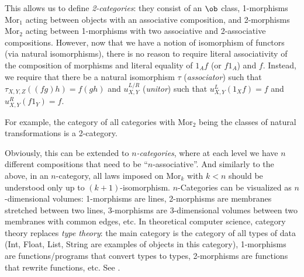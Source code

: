 \begin{rem}
    This allows us to define \emph{2-categories}: they consist of an
    $\ob$ class, 1-morphisms $\mathrm{Mor}_{1}$ acting between objects
    with an associative composition, and 2-morphisms $\mathrm{Mor}_{2}$
    acting between 1-morphisms with two associative and 2-associative
    compositions. However, now that we have a notion of isomorphism of
    functors (via natural isomorphisms), there is no reason to require
    literal associativity of the composition of morphisms and literal
    equality of $1_{A}f$ (or $f1_{A}$) and $f$. Instead, we require
    that there be a natural isomorphism $\tau$ (\emph{associator})
    such that $\tau_{X,Y,Z}\left(\left(fg\right)h\right)=f\left(gh\right)$
    and $u_{X,Y}^{L/R}$ (\emph{unitor}) such that $u_{X,Y}^{L}\left(1_{X}f\right)=f$
    and $u_{X,Y}^{R}\left(f1_{Y}\right)=f$.

    For example, the category of all categories with $\mathrm{Mor}_{2}$
    being the classes of natural transformations is a 2-category.

    Obviously, this can be extended to \emph{$n$-categories}, where
    at each level we have $n$ different compositions that need to be
    ``$n$-associative''. And similarly to the above, in an $n$-category,
    all laws imposed on $\mathrm{Mor}_{k}$ with $k<n$ should be understood
    only up to $\left(k+1\right)$-isomorphism. $n$-Categories can be
    visualized as $n$-dimensional volumes: 1-morphisms are lines, 2-morphisms
    are membranes stretched between two lines, 3-morphisms are 3-dimensional
    volumes between two membranes with common edges, etc. In theoretical
    computer science, category theory replaces \emph{type theory}: the
    main category is the category of all types of data (Int, Float, List,
    String are examples of objects in this category), 1-morphisms are
    functions/programs that convert types to types, 2-morphisms are functions
    that rewrite functions, etc. See \cite{CTCS}.
\end{rem}

